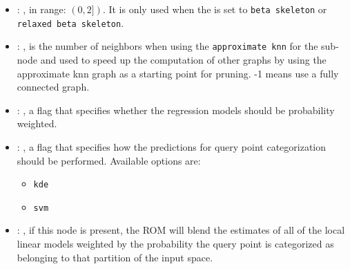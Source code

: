 \begin{itemize}
    \item {}: , 
      in range: $(0, 2])$. It is                                                  only used when the
       is set to \texttt{beta skeleton} or
      \texttt{relaxed beta skeleton}.

    \item {}: , 
      is the number of                                                  neighbors when using the
      \texttt{approximate knn} for the 
      sub-node and used to speed up the computation of other graphs by using the
      approximate knn graph as a starting point for pruning. -1 means use a fully
      connected graph.

    \item {}: , 
      a flag that specifies                                                  whether the regression
      models should be probability weighted.

    \item {}: , 
      a flag that                                                  specifies how the predictions for
      query point categorization  should be
      performed. Available options are:
      \begin{itemize}                                                    \item \texttt{kde}
      \item \texttt{svm}                                                  \end{itemize}

    \item {}: , 
      if this node is present, the ROM will blend the
      estimates of all of the local linear models weighted by the probability the
      query point is categorized as belonging to that partition of the input space.


\end{itemize}

